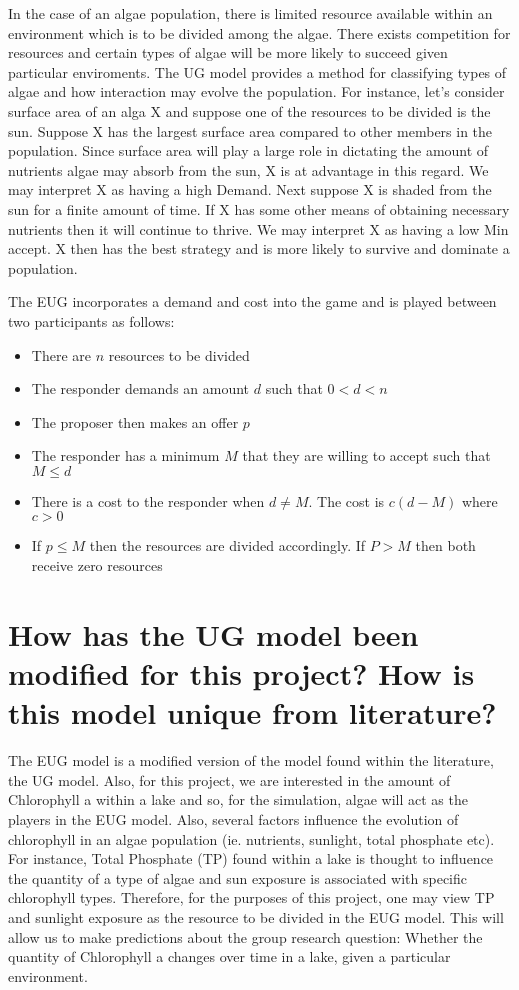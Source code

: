 \documentclass[]{article}
\begin{document}
In the case of an algae population, there is limited resource available
within an environment which is to be divided among the algae. There
exists competition for resources and certain types of algae will be more
likely to succeed given particular enviroments. The UG model provides a
method for classifying types of algae and how interaction may evolve the
population. For instance, let's consider surface area of an alga X and
suppose one of the resources to be divided is the sun. Suppose X has the
largest surface area compared to other members in the population. Since
surface area will play a large role in dictating the amount of nutrients
algae may absorb from the sun, X is at advantage in this regard. We may
interpret X as having a high Demand. Next suppose X is shaded from the
sun for a finite amount of time. If X has some other means of obtaining
necessary nutrients then it will continue to thrive. We may interpret X
as having a low Min accept. X then has the best strategy and is more
likely to survive and dominate a population.

The EUG incorporates a demand and cost into the game and is played
between two participants as follows:

\begin{itemize}
    \item There are $n$ resources to be divided 
    \item The responder demands an amount $d$ such that $0<d<n$
    \item The proposer then makes an offer $p$
    \item The responder has a minimum $M$ that they are willing to accept such that $M \leq d$
    \item There is a cost to the responder when $d \neq M$. The cost is $c(d-M)$ where $c>0$
    \item If $p \leq M$ then the resources are divided accordingly. If $P>M$ then both receive zero resources
\end{itemize}

\section{How has the UG model been modified for this project? How is
this model unique from
literature?}\label{how-has-the-ug-model-been-modified-for-this-project-how-is-this-model-unique-from-literature}

The EUG model is a modified version of the model found within the
literature, the UG model. Also, for this project, we are interested in
the amount of Chlorophyll a within a lake and so, for the simulation,
algae will act as the players in the EUG model. Also, several factors
influence the evolution of chlorophyll in an algae population (ie.
nutrients, sunlight, total phosphate etc). For instance, Total Phosphate
(TP) found within a lake is thought to influence the quantity of a type
of algae and sun exposure is associated with specific chlorophyll types.
Therefore, for the purposes of this project, one may view TP and
sunlight exposure as the resource to be divided in the EUG model. This
will allow us to make predictions about the group research question:
Whether the quantity of Chlorophyll a changes over time in a lake, given
a particular environment.
\end{document}
